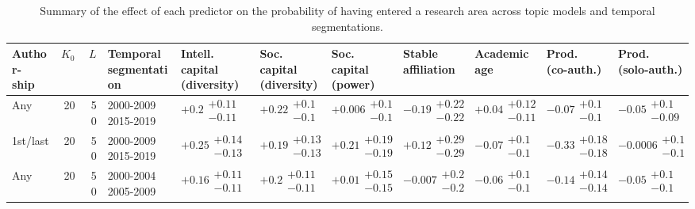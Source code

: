\begin{table}[H]
\caption{Summary of the effect of each predictor on the probability of having entered a research area across topic models and temporal segmentations.}
\label{table:full_summary_entered}
\renewcommand{\arraystretch}{2}\fontsize{6}{7}\selectfont\begin{tabular}{lrrllllllll}
\toprule
\makecell{Author-\\ ship} & $K_0$ & $L$ & \makecell{Temporal \\ segmentation} & \makecell{Intell. capital \\ (diversity)} & \makecell{Soc. capital \\ (diversity)} & \makecell{Soc. capital \\ (power)} & \makecell{Stable \\ affiliation} & \makecell{Academic \\ age} & \makecell{Prod. \\ (co-auth.)} & \makecell{Prod. \\ (solo-auth.)} \\
\midrule
Any & 20 & 50 & \makecell{2000-2009 \\ 2015-2019} & $\bm{+0.2}\substack{+0.11 \\ -0.11}$ & $\bm{+0.22}\substack{+0.1 \\ -0.1}$ & $+0.006\substack{+0.1 \\ -0.1}$ & $-0.19\substack{+0.22 \\ -0.22}$ & $+0.04\substack{+0.12 \\ -0.11}$ & $-0.07\substack{+0.1 \\ -0.1}$ & $-0.05\substack{+0.1 \\ -0.09}$ \\
1st/last & 20 & 50 & \makecell{2000-2009 \\ 2015-2019} & $\bm{+0.25}\substack{+0.14 \\ -0.13}$ & $\bm{+0.19}\substack{+0.13 \\ -0.13}$ & $\bm{+0.21}\substack{+0.19 \\ -0.19}$ & $+0.12\substack{+0.29 \\ -0.29}$ & $-0.07\substack{+0.1 \\ -0.1}$ & $\bm{-0.33}\substack{+0.18 \\ -0.18}$ & $-0.0006\substack{+0.1 \\ -0.1}$ \\
Any & 20 & 50 & \makecell{2000-2004 \\ 2005-2009} & $\bm{+0.16}\substack{+0.11 \\ -0.11}$ & $\bm{+0.2}\substack{+0.11 \\ -0.11}$ & $+0.01\substack{+0.15 \\ -0.15}$ & $-0.007\substack{+0.2 \\ -0.2}$ & $-0.06\substack{+0.1 \\ -0.1}$ & $\bm{-0.14}\substack{+0.14 \\ -0.14}$ & $-0.05\substack{+0.1 \\ -0.1}$ \\

\end{tabular}
\end{table}
